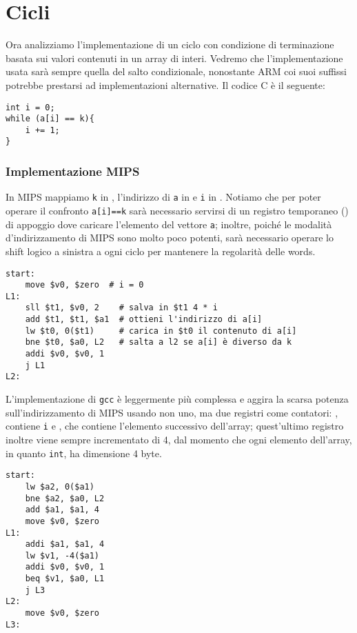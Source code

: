 \documentclass[class=book, crop=false, oneside]{standalone}
\begin{document}
\section{Cicli}
Ora analizziamo l'implementazione di un ciclo con condizione di terminazione basata sui valori contenuti in un array di interi. Vedremo che l'implementazione usata sarà sempre quella del salto condizionale, nonostante ARM coi suoi suffissi potrebbe prestarsi ad implementazioni alternative. Il codice C è il seguente:
\begin{verbatim}
int i = 0;
while (a[i] == k){
	i += 1;
}
\end{verbatim}

\subsubsection{Implementazione MIPS}
In MIPS mappiamo \texttt{k} in , l'indirizzo di \texttt{a} in  e \texttt{i} in . Notiamo che per poter operare il confronto \texttt{a[i]==k} sarà necessario servirsi di un registro temporaneo () di appoggio dove caricare l'elemento del vettore \texttt{a}; inoltre, poiché le modalità d'indirizzamento di MIPS sono molto poco potenti, sarà necessario operare lo shift logico a sinistra a ogni ciclo per mantenere la regolarità delle words.
\begin{verbatim}
start:
	move $v0, $zero	 # i = 0
L1:
	sll $t1, $v0, 2    # salva in $t1 4 * i
	add $t1, $t1, $a1  # ottieni l'indirizzo di a[i]
	lw $t0, 0($t1)     # carica in $t0 il contenuto di a[i]
	bne $t0, $a0, L2   # salta a l2 se a[i] è diverso da k
	addi $v0, $v0, 1
	j L1
L2:
\end{verbatim}

L'implementazione di \texttt{gcc} è leggermente più complessa e aggira la scarsa potenza sull'indirizzamento di MIPS usando non uno, ma due registri come contatori: , contiene \texttt{i} e , che contiene l'elemento successivo dell'array; quest'ultimo registro inoltre viene sempre incrementato di 4, dal momento che ogni elemento dell'array, in quanto \texttt{int}, ha dimensione 4 byte.
\begin{verbatim}
start:
	lw $a2, 0($a1)
	bne $a2, $a0, L2
	add $a1, $a1, 4
	move $v0, $zero
L1:
	addi $a1, $a1, 4
	lw $v1, -4($a1)
	addi $v0, $v0, 1
	beq $v1, $a0, L1
	j L3
L2:
	move $v0, $zero
L3:
\end{verbatim}
\end{document}

